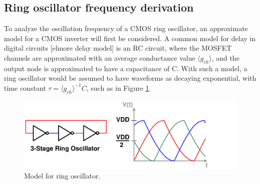 \documentclass[10pt,a4paper]{article}
\begin{document}
	\subsection{Ring oscillator frequency derivation}
	To analyze the oscillation frequency of a CMOS ring oscillator, an approximate model for a CMOS inverter will first be considered. A common model for delay in digital circuits [elmore delay model] is an RC circuit, where the MOSFET channels are approximated with an average conductance value $\langle g_{ch} \rangle$, and the output node is approximated to have a capacitance of C. With such a model, a ring oscillator would be assumed to have waveforms as decaying exponential, with time constant $\tau = \langle g_{ch} \rangle^{-1}C$, such as in Figure \ref{fig:rosc_rc}.
	\begin{figure}[htb!]
		\center\includegraphics[width=0.8\linewidth, angle=0]{figs/inv_waves3.pdf}
		\caption{Model for ring oscillator.}
		\label{fig:rosc_rc}
	\end{figure}
\end{document}
